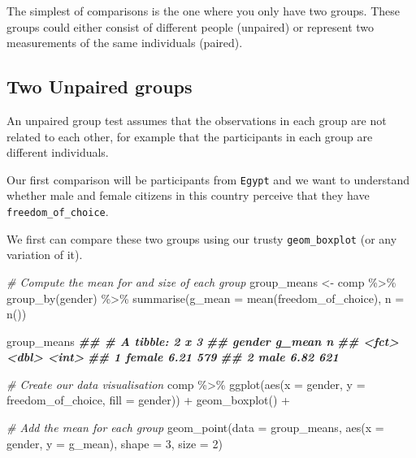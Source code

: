 \documentclass[
]{book}
\newenvironment{Shaded}{\begin{snugshade}}{\end{snugshade}}
\newcommand{\AttributeTok}[1]{\textcolor[rgb]{0.77,0.63,0.00}{#1}}
\newcommand{\CommentTok}[1]{\textcolor[rgb]{0.56,0.35,0.01}{\textit{#1}}}
\newcommand{\DecValTok}[1]{\textcolor[rgb]{0.00,0.00,0.81}{#1}}
\newcommand{\DocumentationTok}[1]{\textcolor[rgb]{0.56,0.35,0.01}{\textbf{\textit{#1}}}}
\newcommand{\FunctionTok}[1]{\textcolor[rgb]{0.00,0.00,0.00}{#1}}
\newcommand{\NormalTok}[1]{#1}
\newcommand{\OtherTok}[1]{\textcolor[rgb]{0.56,0.35,0.01}{#1}}
\newcommand{\SpecialCharTok}[1]{\textcolor[rgb]{0.00,0.00,0.00}{#1}}
\begin{document}
The simplest of comparisons is the one where you only have two groups. These groups could either consist of different people (unpaired) or represent two measurements of the same individuals (paired).

\hypertarget{two-unpaired-groups}{%
\subsection{Two Unpaired groups}\label{two-unpaired-groups}}

An unpaired group test assumes that the observations in each group are not related to each other, for example that the participants in each group are different individuals.

Our first comparison will be participants from \texttt{Egypt} and we want to understand whether male and female citizens in this country perceive that they have \texttt{freedom\_of\_choice}.

We first can compare these two groups using our trusty \texttt{geom\_boxplot} (or any variation of it).

\begin{Shaded}
\begin{Highlighting}[]
\CommentTok{\# Compute the mean for and size of each group }
\NormalTok{group\_means }\OtherTok{\textless{}{-}}\NormalTok{ comp }\SpecialCharTok{\%\textgreater{}\%} 
  \FunctionTok{group\_by}\NormalTok{(gender) }\SpecialCharTok{\%\textgreater{}\%} 
  \FunctionTok{summarise}\NormalTok{(}\AttributeTok{g\_mean =} \FunctionTok{mean}\NormalTok{(freedom\_of\_choice),}
            \AttributeTok{n =} \FunctionTok{n}\NormalTok{())}

\NormalTok{group\_means}
\DocumentationTok{\#\# \# A tibble: 2 x 3}
\DocumentationTok{\#\#   gender g\_mean     n}
\DocumentationTok{\#\#   \textless{}fct\textgreater{}   \textless{}dbl\textgreater{} \textless{}int\textgreater{}}
\DocumentationTok{\#\# 1 female   6.21   579}
\DocumentationTok{\#\# 2 male     6.82   621}

\CommentTok{\# Create our data visualisation}
\NormalTok{comp }\SpecialCharTok{\%\textgreater{}\%} 
  \FunctionTok{ggplot}\NormalTok{(}\FunctionTok{aes}\NormalTok{(}\AttributeTok{x =}\NormalTok{ gender, }\AttributeTok{y =}\NormalTok{ freedom\_of\_choice, }\AttributeTok{fill =}\NormalTok{ gender)) }\SpecialCharTok{+}
  \FunctionTok{geom\_boxplot}\NormalTok{() }\SpecialCharTok{+}
  
  \CommentTok{\# Add the mean for each group}
  \FunctionTok{geom\_point}\NormalTok{(}\AttributeTok{data =}\NormalTok{ group\_means,}
             \FunctionTok{aes}\NormalTok{(}\AttributeTok{x =}\NormalTok{ gender, }\AttributeTok{y =}\NormalTok{ g\_mean),}
             \AttributeTok{shape =} \DecValTok{3}\NormalTok{,}
             \AttributeTok{size =} \DecValTok{2}\NormalTok{)}
\end{Highlighting}
\end{Shaded}
\end{document}
